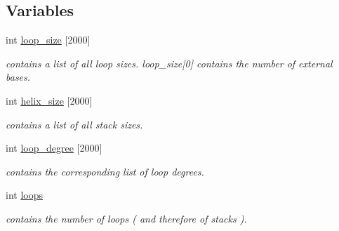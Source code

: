 \subsection*{Variables}
\begin{DoxyCompactItemize}
\item 
\mbox{\label{group__struct__utils__deprecated_ga365a3fad38b21ca8606cb556f2896218}} 
int \hyperlink{group__struct__utils__deprecated_ga365a3fad38b21ca8606cb556f2896218}{loop\+\_\+size} \mbox{[}2000\mbox{]}
\begin{DoxyCompactList}\small\item\em contains a list of all loop sizes. loop\+\_\+size\mbox{[}0\mbox{]} contains the number of external bases. \end{DoxyCompactList}\item 
\mbox{\label{group__struct__utils__deprecated_ga3fce53616c021cbc724fc80b8c1ebeb5}} 
int \hyperlink{group__struct__utils__deprecated_ga3fce53616c021cbc724fc80b8c1ebeb5}{helix\+\_\+size} \mbox{[}2000\mbox{]}
\begin{DoxyCompactList}\small\item\em contains a list of all stack sizes. \end{DoxyCompactList}\item 
\mbox{\label{group__struct__utils__deprecated_ga0518a287aa4a870508cea819029778ab}} 
int \hyperlink{group__struct__utils__deprecated_ga0518a287aa4a870508cea819029778ab}{loop\+\_\+degree} \mbox{[}2000\mbox{]}
\begin{DoxyCompactList}\small\item\em contains the corresponding list of loop degrees. \end{DoxyCompactList}\item 
\mbox{\label{group__struct__utils__deprecated_ga439fcb9f8d4f9f4d2227fde5fbfecb30}} 
int \hyperlink{group__struct__utils__deprecated_ga439fcb9f8d4f9f4d2227fde5fbfecb30}{loops}
\begin{DoxyCompactList}\small\item\em contains the number of loops ( and therefore of stacks ). \end{DoxyCompactList}\item 
\mbox{\label{group__struct__utils__deprecated_gadd2f952597e02d66e1116a9d11d252d6}} 

\end{DoxyCompactItemize}
